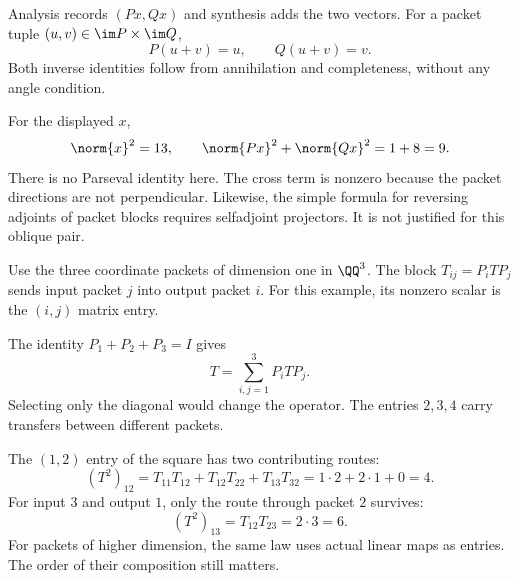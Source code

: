 
Analysis records $(Px,Qx)$ and synthesis adds the two vectors. For a packet tuple $(u,v)\in\im P\times\im Q$,
\[
P(u+v)=u,\qquad Q(u+v)=v.
\]
Both inverse identities follow from annihilation and completeness, without any angle condition.

For the displayed $x$,
\[
\norm{x}^2=13,\qquad \norm{Px}^2+\norm{Qx}^2=1+8=9.
\]
There is no Parseval identity here. The cross term is nonzero because the packet directions are not perpendicular. Likewise, the simple formula for reversing adjoints of packet blocks requires selfadjoint projectors. It is not justified for this oblique pair.


Use the three coordinate packets of dimension one in $\QQ^3$. The block $T_{ij}=P_iTP_j$ sends input packet $j$ into output packet $i$. For this example, its nonzero scalar is the $(i,j)$ matrix entry.


The identity $P_1+P_2+P_3=I$ gives
\[
T=\sum_{i,j=1}^3 P_iTP_j.
\]
Selecting only the diagonal would change the operator. The entries $2,3,4$ carry transfers between different packets.

The $(1,2)$ entry of the square has two contributing routes:
\[
(T^2)_{12}=T_{11}T_{12}+T_{12}T_{22}+T_{13}T_{32}
=1\cdot2+2\cdot1+0=4.
\]
For input $3$ and output $1$, only the route through packet $2$ survives:
\[
(T^2)_{13}=T_{12}T_{23}=2\cdot3=6.
\]
For packets of higher dimension, the same law uses actual linear maps as entries. The order of their composition still matters.


